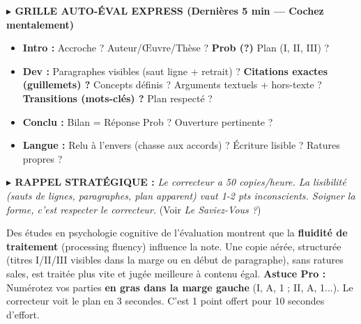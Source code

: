 \documentclass[11pt]{article}
\begin{document}
\begin{exemplebox}
\textbf{$\blacktriangleright$ GRILLE AUTO-\'EVAL EXPRESS (Derni\`eres 5 min --- Cochez mentalement)}
\begin{itemize}
    \item [ ] \textbf{Intro :} Accroche ? Auteur/\OE uvre/Th\`ese ? \textbf{Prob (?) } Plan (I, II, III) ?
    \item [ ] \textbf{Dev :} Paragraphes visibles (saut ligne + retrait) ? \textbf{Citations exactes (guillemets) ?} Concepts d\'efinis ? Arguments textuels + hors-texte ? \textbf{Transitions (mots-cl\'es) ?} Plan respect\'e ?
    \item [ ] \textbf{Conclu :} Bilan = R\'eponse Prob ? Ouverture pertinente ?
    \item [ ] \textbf{Langue :} Relu \`a l'envers (chasse aux accords) ? \'Ecriture lisible ? Ratures propres ?
\end{itemize}
\textbf{$\blacktriangleright$ RAPPEL STRAT\'EGIQUE :} \textit{\og{}Le correcteur a 50 copies/heure. La lisibilit\'e (sauts de lignes, paragraphes, plan apparent) vaut 1-2 pts inconscients. Soigner la forme, c'est respecter le correcteur.\fg{}} (Voir \textit{Le Saviez-Vous ?})
\end{exemplebox}

\begin{savaistu}
Des \'etudes en psychologie cognitive de l'\'evaluation montrent que la \textbf{fluidit\'e de traitement} (processing fluency) influence la note. Une copie a\'er\'ee, structur\'ee (titres I/II/III visibles dans la marge ou en d\'ebut de paragraphe), sans ratures sales, est trait\'ee plus vite et jug\'ee \og{}meilleure\fg{} \`a contenu \'egal. \textbf{Astuce Pro :} Num\'erotez vos parties \textbf{en gras dans la marge gauche} (I, A, 1 ; II, A, 1...). Le correcteur voit le plan en 3 secondes. C'est 1 point offert pour 10 secondes d'effort.
\end{savaistu}
\end{document}
